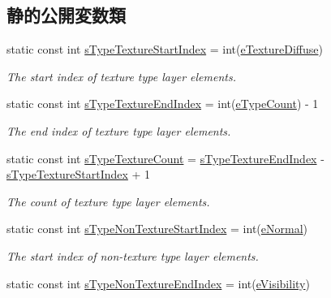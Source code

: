 \subsection*{静的公開変数類}
\begin{DoxyCompactItemize}
\item 
static const int \hyperlink{class_fbx_layer_element_a207301b1a6ecb7cdbce89cb44093d0b7}{s\+Type\+Texture\+Start\+Index} = int(\hyperlink{class_fbx_layer_element_a8c95c5cd880b56c776acd379bd86f42ca09829e6ecf512e7ae04d9ad8de1342fa}{e\+Texture\+Diffuse})
\begin{DoxyCompactList}\small\item\em The start index of texture type layer elements. \end{DoxyCompactList}\item 
static const int \hyperlink{class_fbx_layer_element_aba954f68e4ad849fe7bd18dcd1d2b3ff}{s\+Type\+Texture\+End\+Index} = int(\hyperlink{class_fbx_layer_element_a8c95c5cd880b56c776acd379bd86f42ca0facfbd6e8c7e8dab94db7b1b68166d5}{e\+Type\+Count}) -\/ 1
\begin{DoxyCompactList}\small\item\em The end index of texture type layer elements. \end{DoxyCompactList}\item 
static const int \hyperlink{class_fbx_layer_element_ae7a09ea6aa90f96d37a9e161b9f54094}{s\+Type\+Texture\+Count} = \hyperlink{class_fbx_layer_element_aba954f68e4ad849fe7bd18dcd1d2b3ff}{s\+Type\+Texture\+End\+Index} -\/ \hyperlink{class_fbx_layer_element_a207301b1a6ecb7cdbce89cb44093d0b7}{s\+Type\+Texture\+Start\+Index} + 1
\begin{DoxyCompactList}\small\item\em The count of texture type layer elements. \end{DoxyCompactList}\item 
static const int \hyperlink{class_fbx_layer_element_a13fe30eb6e884901f5ce503f095c716e}{s\+Type\+Non\+Texture\+Start\+Index} = int(\hyperlink{class_fbx_layer_element_a8c95c5cd880b56c776acd379bd86f42cae9b273e2ecbd6c3d1443447d85787f14}{e\+Normal})
\begin{DoxyCompactList}\small\item\em The start index of non-\/texture type layer elements. \end{DoxyCompactList}\item 
static const int \hyperlink{class_fbx_layer_element_a5f1b9591af5822bec240657d21261b43}{s\+Type\+Non\+Texture\+End\+Index} = int(\hyperlink{class_fbx_layer_element_a8c95c5cd880b56c776acd379bd86f42caf85ca5a4db121af287f52758964e0511}{e\+Visibility})

\end{DoxyCompactItemize}
